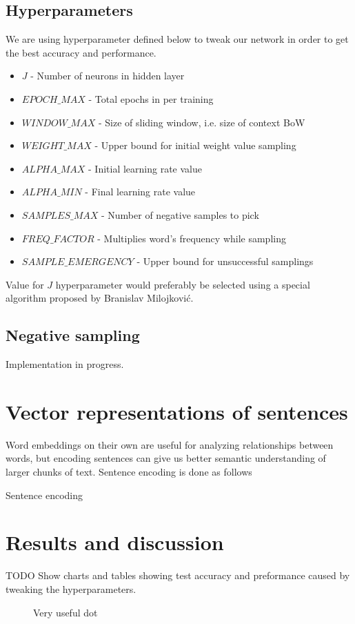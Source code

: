 \documentclass{article}
\newcommand{\SetAlgoStyle}{
	\SetAlgoNoLine
	\SetAlgoNoEnd
	\DontPrintSemicolon
}
\newcommand{\fig}[2]{
	\begin{figure}[!htb]
		\center{\texttt{[image: res/\#1]}}
		\caption{\label{fig:caption} #2}
	\end{figure}
}
\begin{document}
\subsection{Hyperparameters}

We are using hyperparameter defined below to tweak our network in order to get the best accuracy and performance.

\begin{itemize}
	\item $J$ - Number of neurons in hidden layer
	\item $EPOCH\_MAX$ - Total epochs in per training
	\item $WINDOW\_MAX$ - Size of sliding window, i.e. size of context BoW
	\item $WEIGHT\_MAX$ - Upper bound for initial weight value sampling
	\item $ALPHA\_MAX$ - Initial learning rate value
	\item $ALPHA\_MIN$ - Final learning rate value
	\item $SAMPLES\_MAX$ - Number of negative samples to pick
	\item $FREQ\_FACTOR$ - Multiplies word's frequency while sampling
	\item $SAMPLE\_EMERGENCY$ - Upper bound for unsuccessful samplings
\end{itemize}

\medbreak

Value for $J$ hyperparameter would preferably be selected using a
special algorithm proposed by Branislav Milojković.

\subsection{Negative sampling}

Implementation in progress.

\section{Vector representations of sentences}

Word embeddings on their own are useful for analyzing relationships between
words, but encoding sentences can give us better semantic understanding of
larger chunks of text. Sentence encoding is done as follows

\begin{algorithm}[H]
	\SetAlgoStyle
	\caption{Sentence encoding}
\end{algorithm}

\section{Results and discussion}

TODO Show charts and tables showing test accuracy and preformance caused by
tweaking the hyperparameters.

\fig{chart}{Very useful dot}
\end{document}
